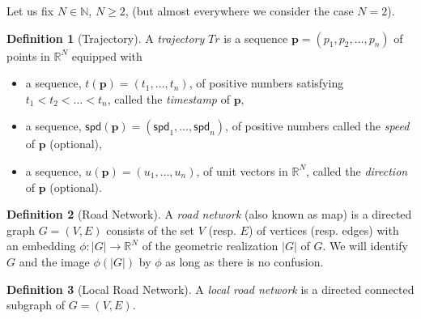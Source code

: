 \documentclass{article}
\numberwithin{equation}{section}
\theoremstyle{definition}
\newtheorem{definition}{Definition}[section]
\newcommand{\N}{\mathbb{N}}
\newcommand{\R}{\mathbb{R}}
\newcommand{\spd}{\mathsf{spd}}
\begin{document}
Let us fix $N\in\N$, $N\geq 2$, (but almost everywhere we consider the case $N = 2$). 
\begin{definition}[Trajectory] \label{Tr}
A \emph{trajectory} $Tr$ is a sequence $\mathbf{p} = (p_1,p_2,\dots, p_n)$ of points in $\R^N$ equipped with
\begin{itemize}
    \item a sequence, $t(\mathbf{p}) = (t_1,\dots,t_{n})$, of positive numbers satisfying $t_1<t_2<\dots <t_n$, called the \emph{timestamp} of $\mathbf{p}$,
    \item a sequence, ${\spd}(\mathbf{p}) = ({\spd}_1,\dots,{\spd}_{n})$, of positive numbers called the \emph{speed} of $\mathbf{p}$ (optional),
    \item a sequence, $u(\mathbf{p}) = (u_1, \dots, u_n)$, of unit vectors in $\R^{N}$, called the \emph{direction} of $\mathbf{p}$ (optional).
\end{itemize}
\end{definition}



\begin{definition}[Road Network] \label{RN}
A  \emph{road network} (also known as map) is a directed graph $G=(V,E)$ consists of the set $V$ (resp. $E$) of vertices (resp. edges) with an embedding $\phi:|G|\rightarrow\mathbb{R}^{N}$ of the geometric realization $|G|$ of $G$.
We will identify $G$ and the image $\phi(|G|)$ by $\phi$ as long as there is no confusion.
\end{definition}

\begin{definition}[Local Road Network] \label{LRN}
A  \emph{local road network} is a directed connected subgraph of $G=(V,E)$.
\end{definition}
\end{document}
